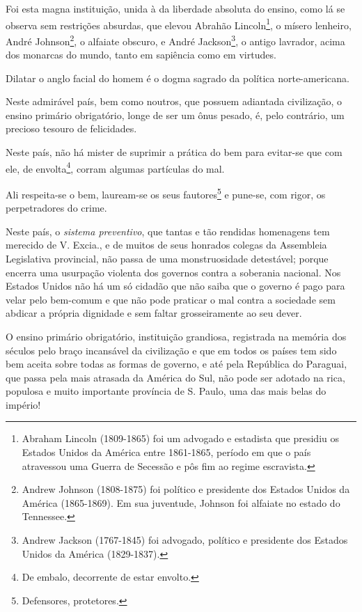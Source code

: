 Foi esta magna instituição, unida à da liberdade absoluta do ensino,
como lá se observa sem restrições absurdas, que elevou Abrahão
Lincoln\footnote{Abraham Lincoln (1809-1865) foi um advogado e
  estadista que presidiu os Estados Unidos da América entre 1861-1865,
  período em que o país atravessou uma Guerra de Secessão e pôs fim ao
  regime escravista.}, o mísero lenheiro, André Johnson\footnote{
  Andrew Johnson (1808-1875) foi político e presidente dos Estados
  Unidos da América (1865-1869). Em sua juventude, Johnson foi alfaiate
  no estado do Tennessee.}, o alfaiate obscuro, e André
Jackson\footnote{Andrew Jackson (1767-1845) foi advogado, político e
  presidente dos Estados Unidos da América (1829-1837).}, o antigo
lavrador, acima dos monarcas do mundo, tanto em sapiência como em
virtudes.

Dilatar o anglo facial do homem é o dogma sagrado da política
norte-americana.

Neste admirável país, bem como noutros, que possuem adiantada
civilização, o ensino primário obrigatório, longe de ser um ônus pesado,
é, pelo contrário, um precioso tesouro de felicidades.

Neste país, não há mister de suprimir a prática do bem para evitar-se
que com ele, de envolta\footnote{De embalo, decorrente de estar
  envolto.}, corram algumas partículas do mal.

Ali respeita-se o bem, lauream-se os seus fautores\footnote{
  Defensores, protetores.} e pune-se, com rigor, os perpetradores do
crime.

Neste país, o \emph{sistema preventivo}, que tantas e tão rendidas
homenagens tem merecido de V. Excia., e de muitos de seus honrados
colegas da Assembleia Legislativa provincial, não passa de uma
monstruosidade detestável; porque encerra uma usurpação violenta dos
governos contra a soberania nacional. Nos Estados Unidos não há um só
cidadão que não saiba que o governo é pago para velar pelo bem-comum e
que não pode praticar o mal contra a sociedade sem abdicar a própria
dignidade e sem faltar grosseiramente ao seu dever.

O ensino primário obrigatório, instituição grandiosa, registrada na
memória dos séculos pelo braço incansável da civilização e que em todos
os países tem sido bem aceita sobre todas as formas de governo, e até
pela República do Paraguai, que passa pela mais atrasada da América do
Sul, não pode ser adotado na rica, populosa e muito importante província
de S. Paulo, uma das mais belas do império!

